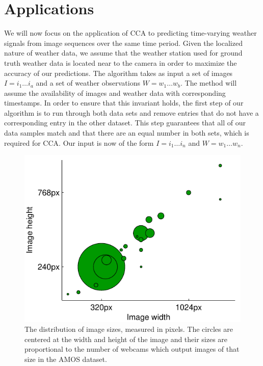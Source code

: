 \section{Applications}
We will now focus on the application of CCA to predicting time-varying weather signals from image sequences over the same time period. Given the localized nature of weather data, we assume that the weather station used for ground truth weather data is located near to the camera in order to maximize the accuracy of our predictions. The algorithm takes as input a set of images $I=i_1\ldots i_a$ and a set of weather observations $W=w_1\ldots w_b$. The method will assume the availability of images and weather data with corresponding timestamps. In order to ensure that this invariant holds, the first step of our algorithm is to run through both data sets and remove entries that do not have a corresponding entry in the other dataset. This step guarantees that all of our data samples match and that there are an equal number in both sets, which is required for CCA. Our input is now of the form $I=i_1\ldots i_n$ and $W=w_1\ldots w_n$.

\begin{figure}
	\centering
		\includegraphics{figures/imagedimensions.pdf}
	\caption{The distribution of image sizes, measured in pixels. The circles are centered at the width and height of the image and their sizes are proportional to the number of webcams which output images of that size in the AMOS dataset.}
	\label{fig:imagedimensions}
\end{figure}

